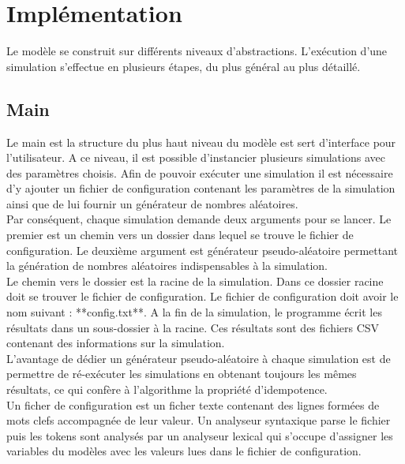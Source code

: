 \chapter{Implémentation} \label{ch:intro}

Le modèle se construit sur différents niveaux d’abstractions. L'exécution d'une simulation s'effectue en plusieurs étapes, du plus général au plus détaillé.

\section{Main}

Le main est la structure du plus haut niveau du modèle est sert d'interface pour l'utilisateur. A ce niveau, il est possible d'instancier plusieurs simulations avec des paramètres choisis. Afin de pouvoir exécuter une simulation il est nécessaire d'y ajouter un fichier de configuration contenant les paramètres de la simulation ainsi que de lui fournir un générateur de nombres aléatoires.\\

Par conséquent, chaque simulation demande deux arguments pour se lancer. Le premier est un chemin vers un dossier dans lequel se trouve le fichier de configuration. Le deuxième argument est générateur pseudo-aléatoire permettant la génération de nombres aléatoires indispensables à la simulation.\\ 

Le chemin vers le dossier est la racine de la simulation. Dans ce dossier racine doit se trouver le fichier de configuration. Le fichier de configuration doit avoir le nom suivant : **config.txt**.  A la fin de la simulation, le programme écrit les résultats dans un sous-dossier à la racine. Ces résultats sont des fichiers CSV contenant des informations sur la simulation.\\

L'avantage de dédier un générateur pseudo-aléatoire à chaque simulation est de permettre de ré-exécuter les simulations en obtenant toujours les mêmes résultats, ce qui confère à l'algorithme la propriété d'idempotence.\\

Un ficher de configuration est un ficher texte contenant des lignes formées de mots clefs accompagnée de leur valeur. Un analyseur syntaxique parse le fichier puis les tokens sont analysés par un analyseur lexical qui s'occupe d'assigner les variables du modèles avec les valeurs lues dans le fichier de configuration.\\ 

